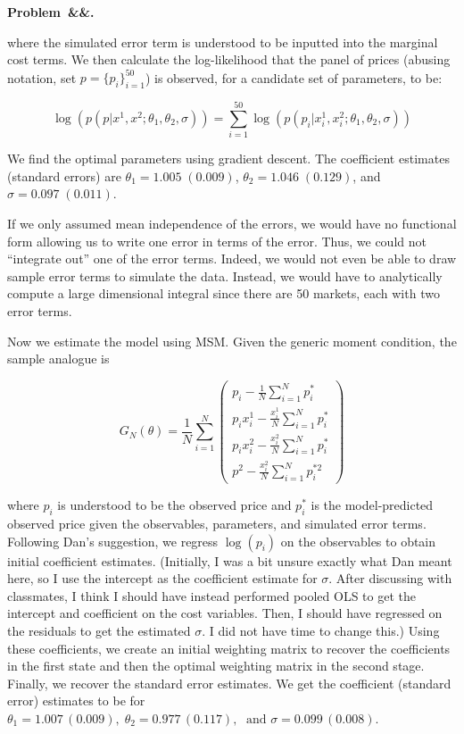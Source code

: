 \documentclass[12pt]{article}
\newcounter{problem}
\newenvironment{problem}[1][]{
    \newpage %
    \refstepcounter{problem}\par\noindent
    \textbf{Problem~\theproblem\ifx&#1&\else.~#1\fi}\rmfamily\par\vspace{0.5em}
}{\vspace{1em}}
\begin{document}
\begin{problem}
\begin{subproblems}
        where the simulated error term is understood to be inputted into the marginal cost terms. We then calculate the log-likelihood that the panel of prices (abusing notation, set $p = \{p_i\}_{i=1}^{50}$) is observed, for a candidate set of parameters, to be:

        $$\log(p(p | x^1, x^2; \theta_1, \theta_2, \sigma)) = \sum_{i=1}^{50}\log(p(p_i | x_i^1, x_i^2; \theta_1, \theta_2, \sigma))$$

        We find the optimal parameters using gradient descent. The coefficient estimates (standard errors) are $\theta_1 = 1.005 \; (0.009)$, $\theta_2 = 1.046 \; (0.129)$, and $\sigma = 0.097 \; (0.011)$. 

        \item If we only assumed mean independence of the errors, we would have no functional form allowing us to write one error in terms of the error. Thus, we could not ``integrate out'' one of the error terms. Indeed, we would not even be able to draw sample error terms to simulate the data. Instead, we would have to analytically compute a large dimensional integral since there are 50 markets, each with two error terms. 
        
        \item Now we estimate the model using MSM. Given the generic moment condition, the sample analogue is 
        
        $$G_N(\theta) = \frac{1}{N}\sum_{i=1}^{N}
        \begin{pmatrix}
            p_i - \frac{1}{N}\sum_{i=1}^{N}p_i^* \\
            p_ix_i^1 - \frac{x_i^1}{N}\sum_{i=1}^{N}p_i^* \\
            p_ix_i^2 - \frac{x_i^2}{N}\sum_{i=1}^{N}p_i^* \\
            p^2 - \frac{x_i^2}{N}\sum_{i=1}^{N}p_i^{*2}
        \end{pmatrix}$$

        where $p_i$ is understood to be the observed price and $p_i^*$ is the model-predicted observed price given the observables, parameters, and simulated error terms. Following Dan's suggestion, we regress $\log(p_i)$ on the observables to obtain initial coefficient estimates. (Initially, I was a bit unsure exactly what Dan meant here, so I use the intercept as the coefficient estimate for $\sigma$. After discussing with classmates, I think I should have instead performed pooled OLS to get the intercept and coefficient on the cost variables. Then, I should have regressed on the residuals to get the estimated $\sigma$. I did not have time to change this.) Using these coefficients, we create an initial weighting matrix to recover the coefficients in the first state and then the optimal weighting matrix in the second stage. Finally, we recover the standard error estimates. We get the coefficient (standard error) estimates to be for $\theta_1 = 1.007 \,(0.009), \; \theta_2 = 0.977 \, (0.117), \; \text{ and } \sigma = 0.099 \, (0.008)$.


\end{subproblems}
\end{problem}
\end{document}
